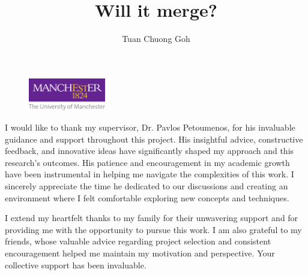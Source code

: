 \documentclass[12pt,BSc,wordcount, oneside]{muthesis}
\begin{document}
\begin{figure}
  \centering
  \includegraphics[width=0.3\textwidth]{uom_logo.pdf}
  \label{fig:uom_logo}
\end{figure} 

\title{Will it merge?}
\author{Tuan Chuong Goh}



\beforeabstract



\afterabstract

I would like to thank my supervisor, Dr. Pavlos Petoumenos, for his invaluable guidance and support throughout this project. His insightful advice, constructive feedback, and innovative ideas have significantly shaped my approach and this research's outcomes. His patience and encouragement in my academic growth have been instrumental in helping me navigate the complexities of this work. I sincerely appreciate the time he dedicated to our discussions and creating an environment where I felt comfortable exploring new concepts and techniques.

I extend my heartfelt thanks to my family for their unwavering support and for providing me with the opportunity to pursue this work. I am also grateful to my friends, whose valuable advice regarding project selection and consistent encouragement helped me maintain my motivation and perspective. Your collective support has been invaluable.

\afterpreface




% 







\appendix

\end{document}
